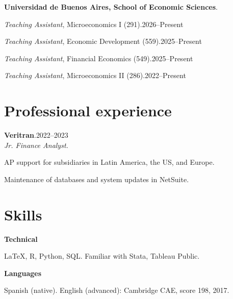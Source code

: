 \documentclass[11pt]{article}
\newcommand{\entrydate}[1]{\hfill{\small{#1}}}
\begin{document}
\textbf{Universidad de Buenos Aires, School of Economic Sciences}.
\begin{cvitems}
  \item \textit{Teaching Assistant}, Microeconomics I (291).\entrydate{2026--Present}
  \item \textit{Teaching Assistant}, Economic Development (559).\entrydate{2025--Present}
  \item \textit{Teaching Assistant}, Financial Economics (549).\entrydate{2025--Present}
  \item \textit{Teaching Assistant}, Microeconomics II (286).\entrydate{2022--Present}
\end{cvitems}

\section{Professional experience}
\textbf{Veritran}.\entrydate{2022--2023}\\
\textit{Jr. Finance Analyst.}
\begin{cvitems}
  \item AP support for subsidiaries in Latin America, the US, and Europe.
  \item Maintenance of databases and system updates in NetSuite.
\end{cvitems}

\section{Skills}
\textbf{Technical}
\begin{cvitems}
  \item LaTeX, R, Python, SQL. Familiar with Stata, Tableau Public.
\end{cvitems}
\textbf{Languages}
\begin{cvitems}
\item Spanish (native). English (advanced): Cambridge CAE, score 198, 2017.
\end{cvitems}
\end{document}
